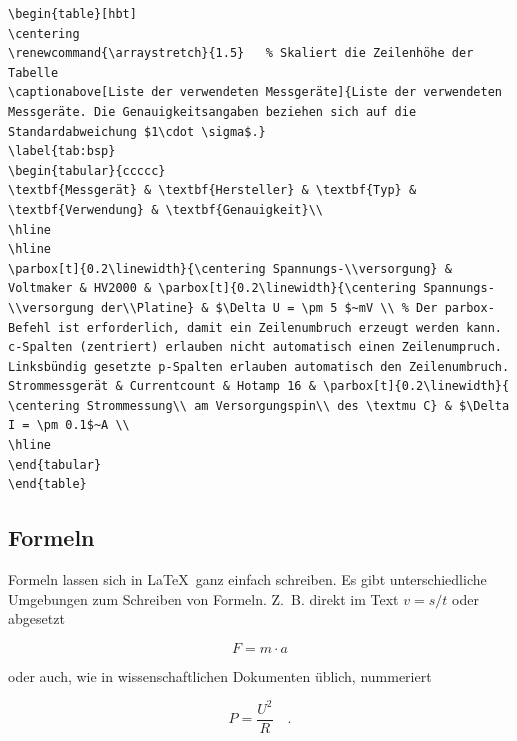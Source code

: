 \begin{minipage}{\linewidth}
\begin{lstlisting}[caption=Quellcode der Tabelle~\ref{tab:bsp}.,label=lst:tab]
\begin{table}[hbt]	
\centering
\renewcommand{\arraystretch}{1.5}	% Skaliert die Zeilenhöhe der Tabelle
\captionabove[Liste der verwendeten Messgeräte]{Liste der verwendeten Messgeräte. Die Genauigkeitsangaben beziehen sich auf die Standardabweichung $1\cdot \sigma$.}
\label{tab:bsp}
\begin{tabular}{ccccc}
\textbf{Messgerät} & \textbf{Hersteller} & \textbf{Typ} & \textbf{Verwendung} & \textbf{Genauigkeit}\\ 
\hline 
\hline 
\parbox[t]{0.2\linewidth}{\centering Spannungs-\\versorgung} & Voltmaker & HV2000 & \parbox[t]{0.2\linewidth}{\centering Spannungs-\\versorgung der\\Platine} & $\Delta U = \pm 5 $~mV \\ % Der parbox-Befehl ist erforderlich, damit ein Zeilenumbruch erzeugt werden kann. c-Spalten (zentriert) erlauben nicht automatisch einen Zeilenumpruch. Linksbündig gesetzte p-Spalten erlauben automatisch den Zeilenumbruch.
Strommessgerät & Currentcount & Hotamp 16 & \parbox[t]{0.2\linewidth}{ \centering Strommessung\\ am Versorgungspin\\ des \textmu C} & $\Delta I = \pm 0.1$~A \\ 
\hline 
\end{tabular} 
\end{table}
\end{lstlisting}
\end{minipage}

\clearpage

\subsection{Formeln}

Formeln lassen sich in \LaTeX~ganz einfach schreiben. Es gibt unterschiedliche Umgebungen zum Schreiben von Formeln. Z.~B. direkt im Text $v=s/t$ oder abgesetzt

\[F=m \cdot a\]

oder auch, wie in wissenschaftlichen Dokumenten üblich, nummeriert

\begin{equation}
P=\frac{U^2}{R} \quad .
\label{eqn:leistung}
\end{equation}


